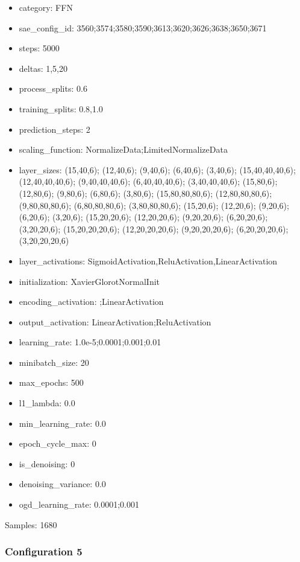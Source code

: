 \documentclass[a4paper,11pt,oneside]{article}
\theoremstyle{plain}
\theoremstyle{definition}
\begin{document}
	\begin{itemize}
		\item category: FFN
		\item sae\_config\_id: 3560;3574;3580;3590;3613;3620;3626;3638;3650;3671
		\item steps: 5000
		\item deltas: 1,5,20
		\item process\_splits: 0.6
		\item training\_splits: 0.8,1.0
		\item prediction\_steps: 2
		\item scaling\_function: NormalizeData;LimitedNormalizeData
		\item layer\_sizes: (15,40,6); (12,40,6); (9,40,6); (6,40,6); (3,40,6); (15,40,40,40,6); (12,40,40,40,6); (9,40,40,40,6); (6,40,40,40,6); (3,40,40,40,6); (15,80,6);(12,80,6); (9,80,6); (6,80,6); (3,80,6); (15,80,80,80,6); (12,80,80,80,6); (9,80,80,80,6); (6,80,80,80,6); (3,80,80,80,6); (15,20,6); (12,20,6); (9,20,6); (6,20,6); (3,20,6); (15,20,20,6); (12,20,20,6); (9,20,20,6); (6,20,20,6); (3,20,20,6); (15,20,20,20,6); (12,20,20,20,6); (9,20,20,20,6); (6,20,20,20,6); (3,20,20,20,6)
		\item layer\_activations: SigmoidActivation,ReluActivation,LinearActivation
		\item initialization: XavierGlorotNormalInit
		\item encoding\_activation: ;LinearActivation
		\item output\_activation: LinearActivation;ReluActivation
		\item learning\_rate: 1.0e-5;0.0001;0.001;0.01
		\item minibatch\_size: 20
		\item max\_epochs: 500
		\item l1\_lambda: 0.0
		\item min\_learning\_rate: 0.0
		\item epoch\_cycle\_max: 0
		\item is\_denoising: 0
		\item denoising\_variance: 0.0
		\item ogd\_learning\_rate: 0.0001;0.001
	\end{itemize}
	
	Samples: 1680
	
	\subsubsection{Configuration 5}\label{config5}
	
\end{document}
